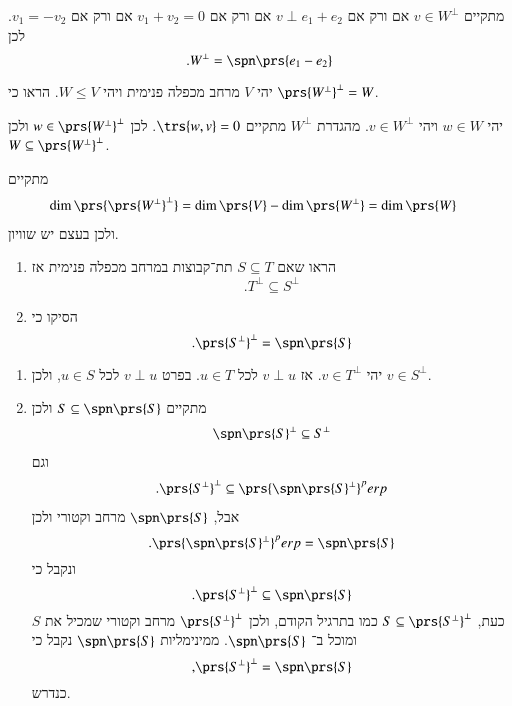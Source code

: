 \documentclass[a4paper,10pt,oneside,openany]{article}
\begin{document}
\begin{solution}
מתקיים
$v \in W^\perp$
אם ורק אם
$v \perp e_1 + e_2$
אם ורק אם
$v_1 + v_2 = 0$
אם ורק אם
$v_1 = - v_2$.
לכן
\[\text{.} W^\perp = \spn\prs{e_1 - e_2}\]
\end{solution}

\begin{exercise}
יהי
$V$
מרחב מכפלה פנימית ויהי
$W \leq V$.
הראו כי
$\prs{W^\perp}^\perp = W$.
\end{exercise}

\begin{solution}
יהי
$w \in W$
ויהי
$v \in W^\perp$.
מהגדרת
$W^\perp$
מתקיים
$\trs{w,v} = 0$.
לכן
$w \in \prs{W^\perp}^\perp$
ולכן
$W \subseteq \prs{W^\perp}^\perp$.

מתקיים
\begin{align*}
\dim\prs{\prs{W^\perp}^\perp} &= \dim\prs{V} - \dim\prs{W^\perp} = \dim\prs{W}
\end{align*}
ולכן בעצם יש שוויון.
\end{solution}

\begin{exercise}
\begin{enumerate}
\item הראו שאם
$S \subseteq T$
תת־קבוצות במרחב מכפלה פנימית אז
\[\text{.} T^\perp \subseteq S^\perp\]
\item הסיקו כי
\[\text{.} \prs{S^\perp}^\perp = \spn\prs{S}\]
\end{enumerate}
\end{exercise}

\begin{solution}
\begin{enumerate}
\item יהי
$v \in T^\perp$.
אז
$v \perp u$
לכל
$u \in T$.
בפרט
$v \perp u$
לכל
$u \in S$,
ולכן
$v \in S^\perp$.

\item
מתקיים
$S \subseteq \spn\prs{S}$
ולכן
\begin{align*}
\spn\prs{S}^\perp \subseteq S^\perp
\end{align*}
וגם
\begin{align*}
\text{.} \prs{S^\perp}^\perp \subseteq \prs{\spn\prs{S}^\perp}^perp
\end{align*}
אבל,
$\spn\prs{S}$
מרחב וקטורי ולכן
\[\text{.} \prs{\spn\prs{S}^\perp}^perp = \spn\prs{S}\]
ונקבל כי
\[\text{.} \prs{S^\perp}^\perp \subseteq \spn\prs{S}\]
כעת,
$S \subseteq \prs{S^\perp}^\perp$
כמו בתרגיל הקודם, ולכן
$\prs{S^\perp}^\perp$
מרחב וקטורי שמכיל את
$S$
ומוכל ב־%
$\spn\prs{S}$.
ממינימליות
$\spn\prs{S}$
נקבל כי
\[\text{,} \prs{S^\perp}^\perp = \spn\prs{S}\]
כנדרש.
\end{enumerate}
\end{solution}
\end{document}
